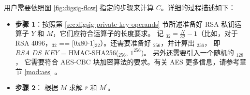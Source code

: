 \documentclass[main\_\_CN.tex]{subfiles}
\begin{document}
用户需要依照图 \ref{fig:digsig-flow} 指定的步骤来计算 \begin{math}C\end{math}。详细的过程描述如下：

\begin{itemize}

    \item {\bfseries 步骤 1}：按照第 \ref{sec:digsig-private-key-operands} 节所述准备好 RSA 私钥运算子 \begin{math}Y\end{math} 和 \begin{math}M\end{math}，它们应符合运算子的长度要求。
          记 \begin{math}[L]_{32} = \frac{N}{32}-1 \end{math}（比如，对于 RSA 4096，\begin{math}[L]_{32}\end{math} == [0x80-1]\begin{math}_{32}\end{math}）。还需要准备好 \begin{math}[HMAC\_KEY]_{256}\end{math}，并计算出 \begin{math}[RSA\_DS\_KEY]_{256}\end{math}， 即 \begin{math}RSA\_DS\_KEY\end{math} = HMAC-SHA256(\begin{math}[HMAC\_KEY]_{256}\end{math}, \begin{math}1^{256}\end{math})。 另外还需要引入一个随机的 \begin{math}[IV]_{128}\end{math}， 它需要符合 AES-CBC 块加密算法的要求。有关 AES 更多信息，请参考章节 \ref{mod:aes} \textit{}。

    \item {\bfseries 步骤 2}：
          根据 \begin{math}M\end{math} 求解 \begin{math}\overline{r}\end{math} 和 \begin{math}M^{\prime} \end{math}。


\end{itemize}
\end{document}

